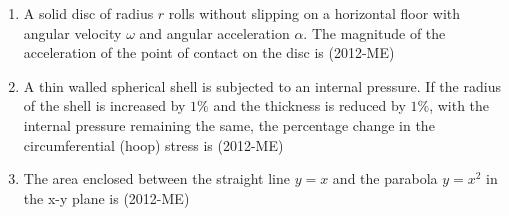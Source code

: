 \documentclass[journal,12pt,twocolumn]{IEEEtran}
\theoremstyle{remark}
\begin{document}
\begin{enumerate}
\item A solid disc of radius $r$ rolls without slipping on a horizontal floor with angular velocity $\omega$ and
angular acceleration $\alpha$. The magnitude of the acceleration of the point of contact on the disc is \hfill{(2012-ME)} 
                 \begin{enumerate}   
                         \end{enumerate}



\item A thin walled spherical shell is subjected to an internal pressure. If the radius of the shell is increased by $1\%$ and the thickness is reduced by $1\%$, with the internal pressure remaining the same, the percentage change in the circumferential (hoop) stress is \hfill{(2012-ME)} 
  \begin{enumerate} 
  \end{enumerate}


\item The area enclosed between the straight line $y = x$ and the parabola $y = x^{2}$ in the x-y plane is \hfill{(2012-ME)} 
                 \begin{enumerate}   
                         \end{enumerate}




\end{enumerate}
\end{document}
